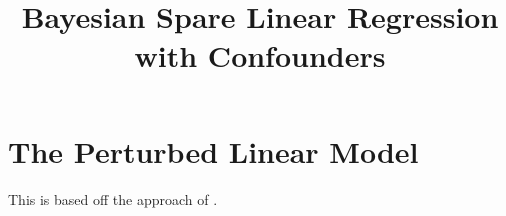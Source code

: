\documentclass[11pt]{article}
\title{Bayesian Spare Linear Regression with Confounders}
\begin{document}
\maketitle

\section{The Perturbed Linear Model}
This is based off the approach of \cite{CBM2020}.



\end{document}
